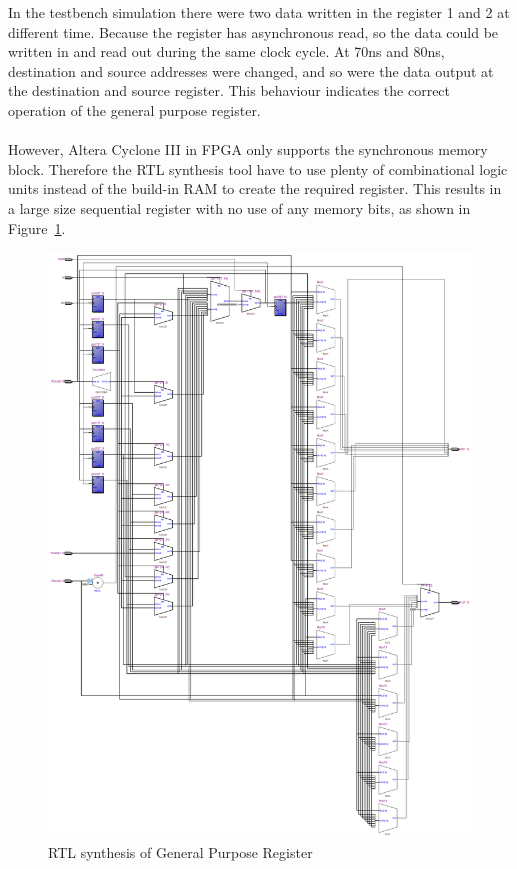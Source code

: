 In the testbench simulation there were two data written in the register 1 and 2 at different time. Because the register has asynchronous read, so the data could be written in and read out during the same clock cycle. At 70ns and 80ns, destination and source addresses were changed, and so were the data output at the destination and source register. This behaviour indicates the correct operation of the general purpose register. \\\\
However, Altera Cyclone III in FPGA only supports the synchronous memory block. Therefore the RTL synthesis tool have to use plenty of combinational logic units instead of the build-in RAM to create the required register. This results in a large size sequential register with no use of any memory bits, as shown in Figure~\ref{fig:register}.
\begin{figure}[H]
		\centering
		\includegraphics[width = \textwidth]{Figures/regs}		
		\caption{RTL synthesis of General Purpose Register}
		\label {fig:register}
\end{figure}
\newpage

